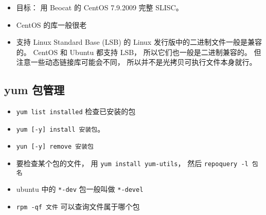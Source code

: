 
\begin{issues}
\issueDraft
\end{issues}

\begin{itemize}
\item 目标： 用 Beocat 的 CentOS 7.9.2009 完整 SLISC。
\item CentOS 的库一般很老
\item 支持 Linux Standard Base (LSB) 的 Linux 发行版中的二进制文件一般是兼容的。 CentOS 和 Ubuntu 都支持 LSB， 所以它们也一般是二进制兼容的。 但注意一些动态链接库可能会不同， 所以并不是光拷贝可执行文件本身就行。
\end{itemize}

\subsection{yum 包管理}
\begin{itemize}
\item \verb|yum list installed| 检查已安装的包
\item \verb|yum [-y] install 安装包|。
\item \verb|yun [-y] remove 安装包|
\item 要检查某个包的文件， 用 \verb|yum install yum-utils|， 然后 \verb|repoquery -l 包名|
\item ubuntu 中的 \verb|*-dev| 包一般叫做 \verb|*-devel|
\item \verb|rpm -qf 文件| 可以查询文件属于哪个包
\end{itemize}
